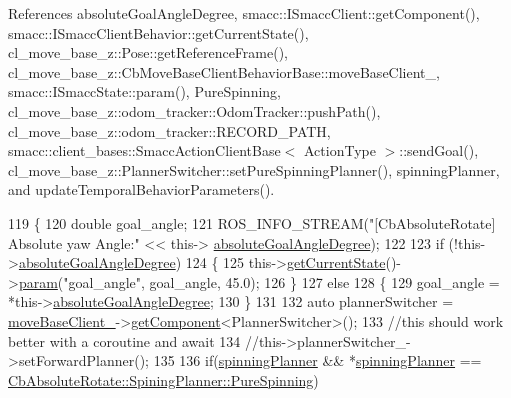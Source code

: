 References absolute\+Goal\+Angle\+Degree, smacc\+::\+I\+Smacc\+Client\+::get\+Component(), smacc\+::\+I\+Smacc\+Client\+Behavior\+::get\+Current\+State(), cl\+\_\+move\+\_\+base\+\_\+z\+::\+Pose\+::get\+Reference\+Frame(), cl\+\_\+move\+\_\+base\+\_\+z\+::\+Cb\+Move\+Base\+Client\+Behavior\+Base\+::move\+Base\+Client\+\_\+, smacc\+::\+I\+Smacc\+State\+::param(), Pure\+Spinning, cl\+\_\+move\+\_\+base\+\_\+z\+::odom\+\_\+tracker\+::\+Odom\+Tracker\+::push\+Path(), cl\+\_\+move\+\_\+base\+\_\+z\+::odom\+\_\+tracker\+::\+R\+E\+C\+O\+R\+D\+\_\+\+P\+A\+TH, smacc\+::client\+\_\+bases\+::\+Smacc\+Action\+Client\+Base$<$ Action\+Type $>$\+::send\+Goal(), cl\+\_\+move\+\_\+base\+\_\+z\+::\+Planner\+Switcher\+::set\+Pure\+Spinning\+Planner(), spinning\+Planner, and update\+Temporal\+Behavior\+Parameters().


\begin{DoxyCode}
119 \{
120     \textcolor{keywordtype}{double} goal\_angle;
121     ROS\_INFO\_STREAM(\textcolor{stringliteral}{"[CbAbsoluteRotate] Absolute yaw Angle:"} << this->
      \hyperlink{classcl__move__base__z_1_1CbAbsoluteRotate_ad5d0e21549940444e1cb525cda73329a}{absoluteGoalAngleDegree});
122 
123     \textcolor{keywordflow}{if} (!this->\hyperlink{classcl__move__base__z_1_1CbAbsoluteRotate_ad5d0e21549940444e1cb525cda73329a}{absoluteGoalAngleDegree})
124     \{
125         this->\hyperlink{classsmacc_1_1ISmaccClientBehavior_a34fde34e48fa13db622ee60d8374d0b8}{getCurrentState}()->\hyperlink{classsmacc_1_1ISmaccState_a4f2ff8e3eda8aa9bbb60c8ff17d0def1}{param}(\textcolor{stringliteral}{"goal\_angle"}, goal\_angle, 45.0);
126     \}
127     \textcolor{keywordflow}{else}
128     \{
129         goal\_angle = *this->\hyperlink{classcl__move__base__z_1_1CbAbsoluteRotate_ad5d0e21549940444e1cb525cda73329a}{absoluteGoalAngleDegree};
130     \}
131 
132     \textcolor{keyword}{auto} plannerSwitcher = \hyperlink{classcl__move__base__z_1_1CbMoveBaseClientBehaviorBase_ab2ef219464cfac8659b4a87c8d0db6d5}{moveBaseClient\_}->\hyperlink{classsmacc_1_1ISmaccClient_adef78db601749ca63c19e74a27cb88cc}{getComponent}<PlannerSwitcher>();
133     \textcolor{comment}{//this should work better with a coroutine and await}
134     \textcolor{comment}{//this->plannerSwitcher\_->setForwardPlanner();}
135     
136     \textcolor{keywordflow}{if}(\hyperlink{classcl__move__base__z_1_1CbAbsoluteRotate_a17d836524599af072cf2e3488e491a91}{spinningPlanner} && *\hyperlink{classcl__move__base__z_1_1CbAbsoluteRotate_a17d836524599af072cf2e3488e491a91}{spinningPlanner} == 
      \hyperlink{classcl__move__base__z_1_1CbAbsoluteRotate_ab8d45e43594a3fc6a71c08f07b5dbef0aada5274435681a4ce04175bebfa6652f}{CbAbsoluteRotate::SpiningPlanner::PureSpinning})

\end{DoxyCode}
